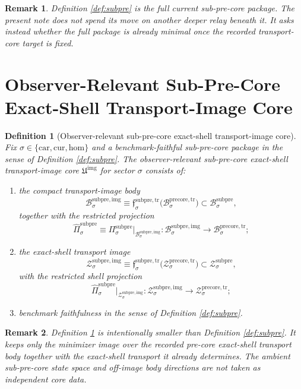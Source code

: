 \documentclass[11pt]{article}
\newcommand{\Car}{\mathrm{car}}
\newcommand{\Cur}{\mathrm{cur}}
\newcommand{\Hom}{\mathrm{hom}}
\newcommand{\PreCoreTrBody}[1]{\mathcal B_{#1}^{\mathrm{precore,tr}}}
\newcommand{\PreCoreTrShell}[1]{\mathcal Z_{#1}^{\mathrm{precore,tr}}}
\newcommand{\SubPreCoreBody}[1]{\mathcal B_{#1}^{\mathrm{subpre}}}
\newcommand{\SubPreCoreProj}[1]{\Pi_{#1}^{\mathrm{subpre}}}
\newcommand{\SubPreCoreTransportMin}[1]{\mathfrak f_{#1}^{\mathrm{subpre,tr}}}
\newcommand{\SubPreCoreShellSet}[1]{\mathcal Z_{#1}^{\mathrm{subpre}}}
\newcommand{\SubPreImageCore}{\mathfrak U^{\mathrm{img}}}
\newcommand{\SubPreImgBody}[1]{\mathcal B_{#1}^{\mathrm{subpre,img}}}
\newcommand{\SubPreImgProj}[1]{\widehat{\Pi}_{#1}^{\mathrm{subpre}}}
\newcommand{\SubPreImgShell}[1]{\mathcal Z_{#1}^{\mathrm{subpre,img}}}
\newtheorem{definition}{Definition}
\newtheorem{remark}{Remark}
\begin{document}
\begin{remark}
Definition \ref{def:subpre} is the full current sub-pre-core package. The present note does not spend its move on another deeper relay beneath it. It asks instead whether the full package is already minimal once the recorded transport-core target is fixed.
\end{remark}

\section{Observer-Relevant Sub-Pre-Core Exact-Shell Transport-Image Core}

\begin{definition}[Observer-relevant sub-pre-core exact-shell transport-image core]
\label{def:imagecore}
Fix \(\sigma\in\{\Car,\Cur,\Hom\}\) and a benchmark-faithful sub-pre-core package in the sense of Definition \ref{def:subpre}. The \emph{observer-relevant sub-pre-core exact-shell transport-image core} \(\SubPreImageCore\) for sector \(\sigma\) consists of:
\begin{enumerate}
    \item the compact transport-image body
    \[
    \SubPreImgBody{\sigma}
    \equiv
    \SubPreCoreTransportMin{\sigma}\bigl(\PreCoreTrBody{\sigma}\bigr)
    \subset
    \SubPreCoreBody{\sigma},
    \]
    together with the restricted projection
    \[
    \SubPreImgProj{\sigma}
    \equiv
    \SubPreCoreProj{\sigma}\big|_{\SubPreImgBody{\sigma}}
    :
    \SubPreImgBody{\sigma}\to\PreCoreTrBody{\sigma};
    \]
    \item the exact-shell transport image
    \[
    \SubPreImgShell{\sigma}
    \equiv
    \SubPreCoreTransportMin{\sigma}\bigl(\PreCoreTrShell{\sigma}\bigr)
    \subset
    \SubPreCoreShellSet{\sigma},
    \]
    with the restricted shell projection
    \[
    \SubPreImgProj{\sigma}\big|_{\SubPreImgShell{\sigma}}
    :
    \SubPreImgShell{\sigma}\to\PreCoreTrShell{\sigma};
    \]
    \item benchmark faithfulness in the sense of Definition \ref{def:subpre}.
\end{enumerate}
\end{definition}

\begin{remark}
Definition \ref{def:imagecore} is intentionally smaller than Definition \ref{def:subpre}. It keeps only the minimizer image over the recorded pre-core exact-shell transport body together with the exact-shell transport it already determines. The ambient sub-pre-core state space and off-image body directions are not taken as independent core data.
\end{remark}
\end{document}
